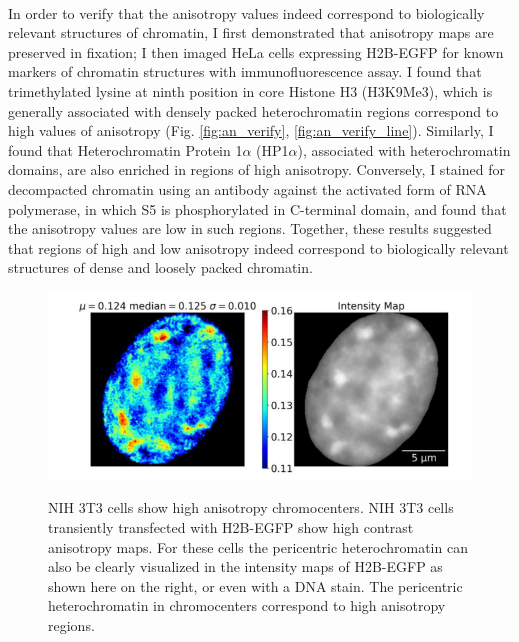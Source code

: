 \paragraph*{} In order to verify that the anisotropy values indeed correspond to biologically relevant structures of chromatin, I first demonstrated that anisotropy maps are preserved in fixation; I then imaged HeLa cells expressing H2B-EGFP for known markers of chromatin structures with immunofluorescence assay. I found that trimethylated lysine at ninth position in core Histone H3 (H3K9Me3), which is generally associated with densely packed heterochromatin regions correspond to high values of anisotropy (Fig. \ref{fig:an_verify}, \ref{fig:an_verify_line}). Similarly, I found that Heterochromatin Protein 1$\alpha$ (HP1$\alpha$), associated with heterochromatin domains, are also enriched in regions of high anisotropy. Conversely, I stained for decompacted chromatin using an antibody against the activated form of RNA polymerase, in which S5 is phosphorylated in C-terminal domain, and found that the anisotropy values are low in such regions. Together, these results suggested that regions of high and low anisotropy indeed correspond to biologically relevant structures of dense and loosely packed chromatin.  


\begin{figure}[H]
    {\hfill\includegraphics[clip,width=0.8\linewidth]{figures/nih.png}\hspace*{\fill}}
    \caption{NIH 3T3 cells show high anisotropy chromocenters. NIH 3T3 cells transiently transfected with H2B-EGFP show high contrast anisotropy maps. For these cells the pericentric heterochromatin can also be clearly visualized in the intensity maps of H2B-EGFP as shown here on the right, or even with a DNA stain. The pericentric heterochromatin in chromocenters correspond to high anisotropy regions.}
    {\label{fig:nih}}
\end{figure}

